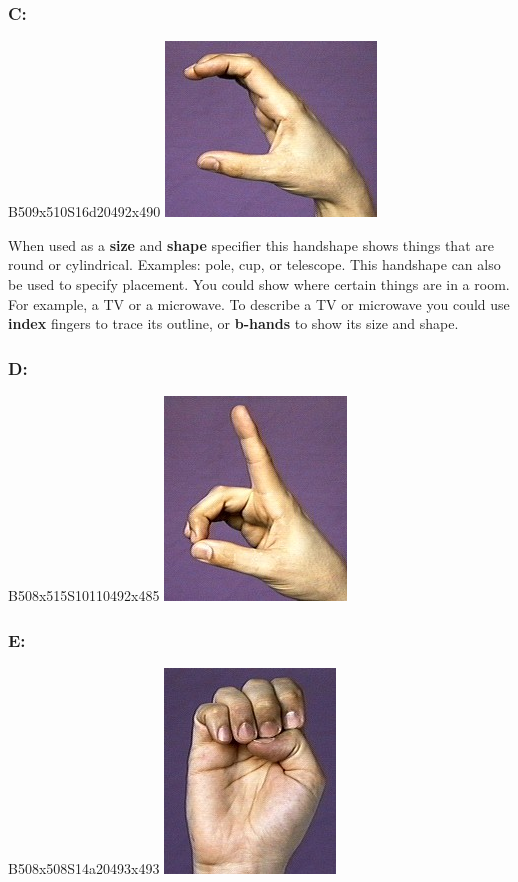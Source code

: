 \documentclass{article}
\begin{document}
\subsubsection{C:}

B509x510S16d20492x490 \includegraphics[scale=0.5]{images/c.jpg}

When used as a \textbf{size} and \textbf{shape} specifier this handshape shows things that are round or cylindrical.
Examples: pole, cup, or telescope.
This handshape can also be used to specify placement.
You could show where certain things are in a room.
For example, a TV or a microwave.
To describe a TV or microwave you could use \textbf{index} fingers to trace its outline, or \textbf{b-hands} to show its size and shape.

\subsubsection{D:}

B508x515S10110492x485 \includegraphics[scale=0.5]{images/d.jpg}

\subsubsection{E:}

B508x508S14a20493x493 \includegraphics[scale=0.5]{images/e.jpg}
\end{document}
